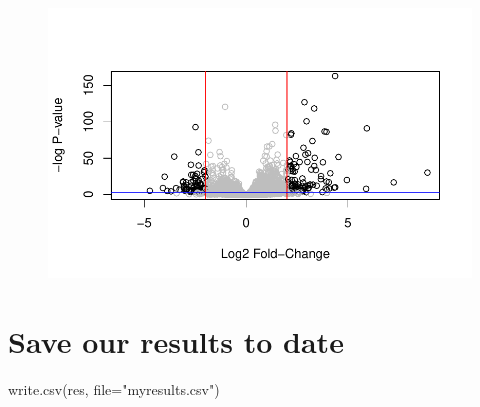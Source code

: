 \documentclass[
  letterpaper,
  DIV=11,
  numbers=noendperiod]{scrartcl}
\newenvironment{Shaded}{\begin{snugshade}}{\end{snugshade}}
\newcommand{\AttributeTok}[1]{\textcolor[rgb]{0.40,0.45,0.13}{#1}}
\newcommand{\DecValTok}[1]{\textcolor[rgb]{0.68,0.00,0.00}{#1}}
\newcommand{\FloatTok}[1]{\textcolor[rgb]{0.68,0.00,0.00}{#1}}
\newcommand{\FunctionTok}[1]{\textcolor[rgb]{0.28,0.35,0.67}{#1}}
\newcommand{\NormalTok}[1]{\textcolor[rgb]{0.00,0.23,0.31}{#1}}
\newcommand{\SpecialCharTok}[1]{\textcolor[rgb]{0.37,0.37,0.37}{#1}}
\newcommand{\StringTok}[1]{\textcolor[rgb]{0.13,0.47,0.30}{#1}}
\begin{document}
\begin{Shaded}
\end{Shaded}

\begin{figure}[H]

{\centering \includegraphics{Class13_files/figure-pdf/unnamed-chunk-27-1.pdf}

}

\end{figure}

\hypertarget{save-our-results-to-date}{%
\section{Save our results to date}\label{save-our-results-to-date}}

\begin{Shaded}
\begin{Highlighting}[]
\FunctionTok{write.csv}\NormalTok{(res, }\AttributeTok{file=}\StringTok{"myresults.csv"}\NormalTok{)}
\end{Highlighting}
\end{Shaded}
\end{document}
